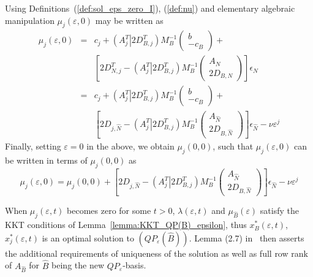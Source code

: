 \documentclass[a4paper]{article}
\begin{document}
Using Definitions~(\ref{def:sol_eps_zero_I}), (\ref{def:nu}) and elementary
algebraic manipulation
$\mu_{j}(\varepsilon,0)$ may be written as
\begin{eqnarray*}
  \mu_{j}\left(\varepsilon, 0\right) &=& c_{j} +
  \left(A_{j}^{T} \left|\right. 2D_{B, j}^{T} \right)
  M_{B}^{-1}
  \left(\begin{array}{c}
          b \\
	  \hline
	  -c_{B}
	\end{array}
  \right) + \\
  &&
  \left[2D_{N, j}^{T} -
    \left(A_{j}^{T} \left|\right. 2D_{B, j}^{T} \right)
    M_{B}^{-1}
    \left(\begin{array}{c}
            A_{N} \\
	    \hline
	    2D_{B,N}
	  \end{array}
    \right)
  \right]\epsilon_{N} \\
  &=& c_{j} +
  \left(A_{j}^{T} \left| \right. 2D_{B, j}^{T} \right)
  M_{B}^{-1}
  \left(\begin{array}{c}
          b \\
	  \hline
	  -c_{B}
	\end{array}
  \right) + \\
  &  &
  \left[
    2D_{j, \hat{N}} - \left(A_{j}^{T} \left| \right. 2D_{B, j}^{T} \right)
    M_{B}^{-1}
    \left(\begin{array}{c}
            A_{\hat{N}} \\
	    \hline
	    2D_{B, \hat{N}}
	  \end{array}
    \right)
  \right]\epsilon_{\hat{N}} - \nu\varepsilon^{j}
\end{eqnarray*}
Finally, setting $\varepsilon=0$ in the above, we obtain $\mu_{j}(0, 0)$, such
that $\mu_{j}(\varepsilon, 0)$ can be written in terms of $\mu_{j}(0,0)$ as
\begin{equation}
\label{eq:mu_j_eps_zero}
\mu_{j}\left(\varepsilon, 0\right) =
  \mu_{j}\left(0,0\right) +
    \left[
    2D_{j, \hat{N}} - \left(A_{j}^{T} \left| \right. 2D_{B, j}^{T} \right)
    M_{B}^{-1}
    \left(\begin{array}{c}
            A_{\hat{N}} \\
	    \hline
	    2D_{B, \hat{N}}
	  \end{array}
    \right)
  \right]\epsilon_{\hat{N}} - \nu\varepsilon^{j} 
\end{equation}

When $\mu_{j}\left(\varepsilon, t\right)$ becomes zero for some $t > 0$,
$\lambda\left(\varepsilon, t\right)$ and $\mu_{\hat{B}}(\varepsilon)$ satisfy
the KKT conditions of Lemma~\ref{lemma:KKT_QP(B)_epsilon}, thus
$x_{B}^{*}\left(\varepsilon, t\right)$,
$x_{j}^{*}\left(\varepsilon, t\right)$ is an optimal solution to
$(QP_{\varepsilon}(\hat{B}))$. Lemma (2.7) in~\cite{Sven} then asserts the
additional requirements of uniqueness of the solution as well as full row rank
of $A_{\hat{B}}$ for $\hat{B}$ being the new $QP_{\varepsilon}$-basis.
\end{document}
